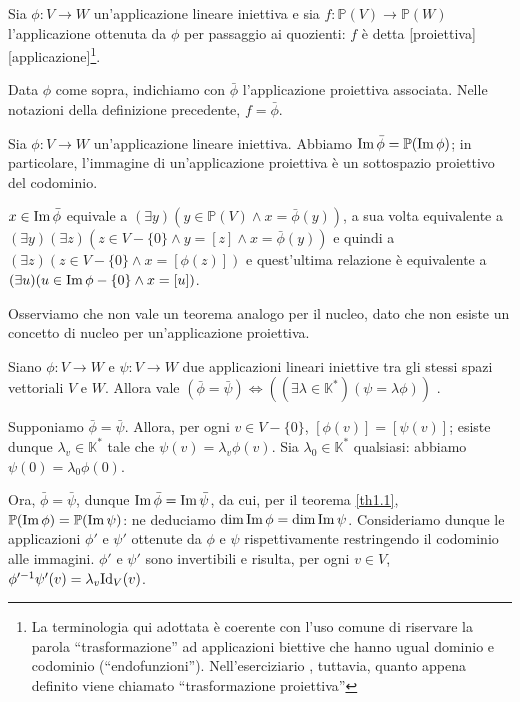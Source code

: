 \begin{Definition}\label{def5}
	Sia $\phi: V \rightarrow W$ un'applicazione lineare iniettiva e sia $f: \mathbb{P}(V) \rightarrow \mathbb{P}(W)$ l'applicazione ottenuta da $\phi$ per passaggio ai quozienti: $f$ \`e detta [proiettiva][applicazione]\footnote{La terminologia qui adottata \`e coerente con l'uso comune di riservare la parola ``trasformazione'' ad applicazioni biettive che hanno ugual dominio e codominio (``endofunzioni''). Nell'eserciziario \cite{1}, tuttavia, quanto appena definito viene chiamato ``trasformazione proiettiva''}.
\end{Definition}
	\par  Data $\phi$ come sopra, indichiamo con $\bar{\phi}$ l'applicazione proiettiva associata. Nelle notazioni della definizione precedente, $f = \bar{\phi}$.
\begin{Theorem}\label{th1.1}
	Sia $\phi: V \rightarrow W$ un'applicazione lineare iniettiva. Abbiamo $\operatorname{Im} \bar{\phi} = \mathbb{P}(\operatorname{Im} \phi)$; in particolare, l'immagine di un'applicazione proiettiva \`e un sottospazio proiettivo del codominio.
\end{Theorem}
\Proof $x \in \operatorname{Im} \bar{\phi}$ equivale a $(\exists y)(y \in \mathbb{P}(V) \land x = \bar{\phi}(y))$, a sua volta equivalente a $(\exists y)(\exists z)(z \in V - \lbrace 0 \rbrace \land y = [z] \land x = \bar{\phi}(y))$ e quindi a $(\exists z)(z \in V - \lbrace 0 \rbrace \land x = [\phi(z)])$ e quest'ultima relazione \`e equivalente a $(\exists u)(u \in \operatorname{Im} \phi - \lbrace 0 \rbrace \land x = [u])$. \EndProof
	\par Osserviamo che non vale un teorema analogo per il nucleo, dato che non esiste un concetto di nucleo per un'applicazione proiettiva.
\begin{Theorem}\label{th2}
	Siano $\phi: V \rightarrow W$ e $\psi: V \rightarrow W$ due applicazioni lineari iniettive tra gli stessi spazi vettoriali $V$ e $W$. Allora vale $(\bar{\phi} = \bar{\psi}) \Leftrightarrow ((\exists \lambda \in \mathbb{K}^*)(\psi = \lambda\phi))$ .
\end{Theorem}
\Proof Supponiamo $\bar{\phi} = \bar{\psi}$. Allora, per ogni $v \in V - \lbrace 0 \rbrace$, $[\phi(v)] = [\psi(v)]$; esiste dunque $\lambda_v \in \mathbb{K}^*$ tale che $\psi(v) = \lambda_v \phi(v)$. Sia $\lambda_0 \in \mathbb{K}^*$ qualsiasi: abbiamo $\psi(0) = \lambda_0 \phi(0)$.
	\par Ora, $\bar{\phi} = \bar{\psi}$, dunque $\operatorname{Im} \bar{\phi} = \operatorname{Im} \bar{\psi}$, da cui, per il teorema \ref{th1.1}, $\mathbb{P}(\operatorname{Im} \phi) = \mathbb{P}(\operatorname{Im} \psi)$: ne deduciamo $\dim \operatorname{Im} \phi = \dim \operatorname{Im} \psi$. Consideriamo dunque le applicazioni $\phi'$ e $\psi'$ ottenute da $\phi$ e $\psi$ rispettivamente restringendo il codominio alle immagini. $\phi'$ e $\psi'$ sono invertibili e risulta, per ogni $v \in V$, $\phi'^{-1} \psi'(v) = \lambda_v \Identity_V(v)$.
